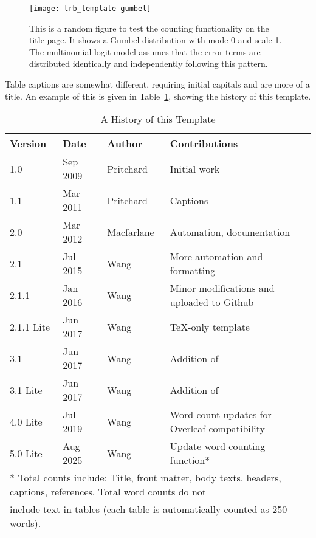 \documentclass[numbered]{trbunofficial}
\begin{document}
\begin{figure}[!ht]
  \centering
  \texttt{[image: trb\_template-gumbel]}
  \caption{This is a random figure to test the counting functionality on the title page. It shows a Gumbel distribution with mode 0 and scale 1. The multinomial logit model assumes that the error terms are distributed identically and independently following this pattern.}\label{fig:trial}
\end{figure}

Table captions are somewhat different, requiring initial capitals and are more of a title. An example of this is given in Table~\ref{tab:versions}, showing the history of this template.

\begin{table}[!ht]
	\caption{A History of this Template}\label{tab:versions}
	\begin{center}
		\begin{tabular}{l l l l}
			Version & Date & Author & Contributions \\\hline
			1.0   & Sep 2009 & Pritchard & Initial work \\
			1.1   & Mar 2011 & Pritchard & Captions \\
			2.0   & Mar 2012 & Macfarlane& Automation, documentation\\
			2.1   & Jul 2015 & Wang      & More automation and formatting\\
			2.1.1 & Jan 2016 & Wang      & Minor modifications and uploaded to Github\\
			2.1.1 Lite & Jun 2017 & Wang & \TeX-only template \\
			3.1   & Jun 2017 & Wang      & Addition of \verb1trbunofficial.cls1\\
			3.1 Lite & Jun 2017 & Wang   & Addition of \verb1trbunofficial.cls1\\
			4.0 Lite & Jul 2019 & Wang   & Word count updates for Overleaf compatibility\\
            5.0 Lite & Aug 2025 & Wang   & Update word counting function*\\\hline
                \multicolumn{4}{l}{\footnotesize
                * Total counts include: Title, front matter, body texts, headers, captions, references. Total word counts do not}\\
                \multicolumn{4}{l}{\footnotesize include text in tables (each table is automatically counted as 250 words).} \\
		\end{tabular}
	\end{center}
\end{table}
\end{document}
